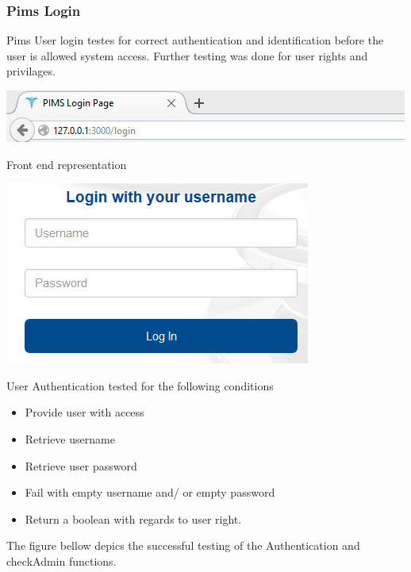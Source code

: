  \subsubsection{Pims Login}
Pims User login testes for correct authentication and identification before the user is allowed system access. Further testing was done for user rights and privilages.
\newline

\includegraphics[width=\linewidth]{./Graphics/login.jpg}
\newline

Front end representation
\newline

\includegraphics[width=\linewidth]{./Graphics/frontEnd.jpg}
		
User Authentication tested for the following conditions					
	\begin{itemize}
				\item Provide user with access
				\item Retrieve username
				\item Retrieve user password
				\item Fail with empty username and/ or empty password
				\item Return a boolean with regards to user right.
 \end{itemize}
 
 The figure bellow depics the successful testing of the Authentication and checkAdmin functions.
 \newline
 
